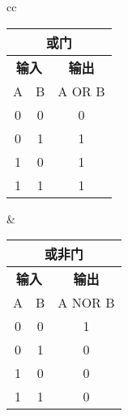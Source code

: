 \begin{tabular}{cc}%
  \begin{tabular}{|c|c|c|}
    \multicolumn{3}{c}{\textbf{或门}}                           \\
    \hline
    \multicolumn{2}{|c|}{\textbf{输入}} & \textbf{输出}           \\
    \hline
    A                                 & B           & A OR B  \\
    \hline
    \num{0}                           & \num{0}     & \num{0} \\
    \hline
    \num{0}                           & \num{1}     & \num{1} \\
    \hline
    \num{1}                           & \num{0}     & \num{1} \\
    \hline
    \num{1}                           & \num{1}     & \num{1} \\
    \hline
  \end{tabular} &
  \begin{tabular}{|c|c|c|}
    \multicolumn{3}{c}{\textbf{或非门}}                          \\
    \hline
    \multicolumn{2}{|c|}{\textbf{输入}} & \textbf{输出}           \\
    \hline
    A                                 & B           & A NOR B \\
    \hline
    \num{0}                           & \num{0}     & \num{1} \\
    \hline
    \num{0}                           & \num{1}     & \num{0} \\
    \hline
    \num{1}                           & \num{0}     & \num{0} \\
    \hline
    \num{1}                           & \num{1}     & \num{0} \\
    \hline
  \end{tabular}  \tabularnewline
\end{tabular}

\bigskip

